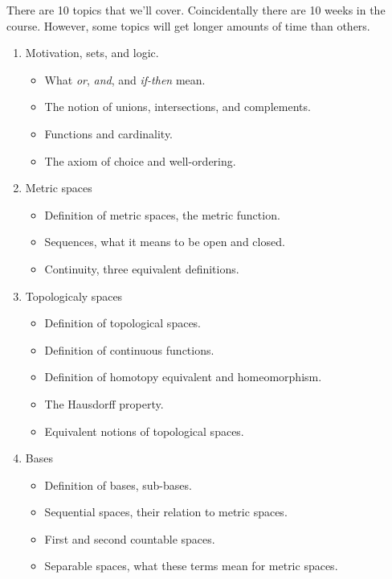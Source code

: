 \documentclass{article}
\begin{document}
    There are 10 topics that we'll cover. Coincidentally there are 10 weeks in
    the course. However, some topics will get longer amounts of time than
    others.
    \begin{enumerate}
        \item Motivation, sets, and logic.
            \begin{itemize}
                \item What \textit{or}, \textit{and}, and \textit{if-then} mean.
                \item The notion of unions, intersections, and complements.
                \item Functions and cardinality.
                \item The axiom of choice and well-ordering.
            \end{itemize}
        \item Metric spaces
            \begin{itemize}
                \item Definition of metric spaces, the metric function.
                \item Sequences, what it means to be open and closed.
                \item Continuity, three equivalent definitions.
            \end{itemize}
        \item Topologicaly spaces
            \begin{itemize}
                \item Definition of topological spaces.
                \item Definition of continuous functions.
                \item Definition of homotopy equivalent and homeomorphism.
                \item The Hausdorff property.
                \item Equivalent notions of topological spaces.
            \end{itemize}
        \item Bases
            \begin{itemize}
                \item Definition of bases, sub-bases.
                \item Sequential spaces, their relation to metric spaces.
                \item First and second countable spaces.
                \item Separable spaces, what these terms mean for metric spaces.

\end{itemize}
\end{enumerate}
\end{document}
